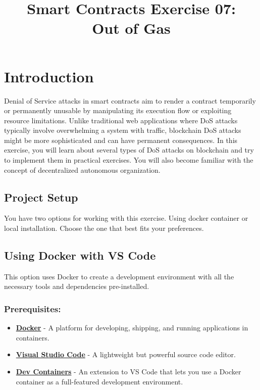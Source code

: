 \documentclass[12pt]{article}
\title{Smart Contracts Exercise 07: \\ Out of Gas}
\author{}
\date{}
\begin{document}
\maketitle
\section{Introduction}

Denial of Service attacks in smart contracts aim to render a contract temporarily or permanently unusable by manipulating its execution flow or exploiting resource limitations. Unlike traditional web applications where DoS attacks typically involve overwhelming a system with traffic, blockchain DoS attacks might be more sophisticated and can have permanent consequences. In this exercise, you will learn about several types of DoS attacks on blockchain and try to implement them in practical exercises. You will also become familiar with the concept of decentralized autonomous organization.

\subsection*{Project Setup}

You have two options for working with this exercise. Using docker container or local installation. Choose the one that best fits your preferences.

\subsection{Using Docker with VS Code}

This option uses Docker to create a development environment with all the necessary tools and dependencies pre-installed.

\subsubsection*{Prerequisites:}

\begin{itemize}
    \item \textbf{\href{https://www.docker.com/products/docker-desktop}{Docker}} - A platform for developing, shipping, and running applications in containers.
    \item \textbf{\href{https://code.visualstudio.com/}{Visual Studio Code}} - A lightweight but powerful source code editor.
    \item \textbf{\href{https://marketplace.visualstudio.com/items?itemName=ms-vscode-remote.remote-containers}{Dev Containers}} - An extension to VS Code that lets you use a Docker container as a full-featured development environment.
\end{itemize}
\end{document}
